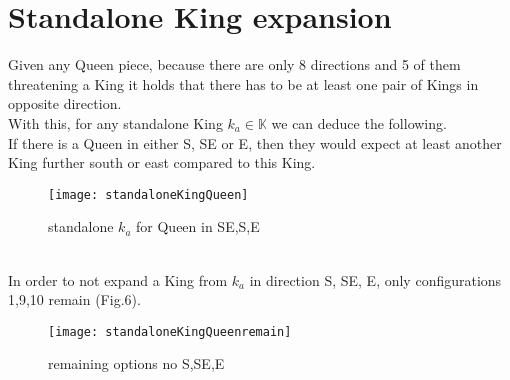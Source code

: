 \documentclass[a4paper,oneside]{scrarticle}
\begin{document}
	\section{Standalone King expansion}
	Given any Queen piece, because there are only 8 directions and 5 of them threatening a King it holds that there has to be at least one pair of Kings in opposite direction.\\
	With this, for any standalone King $k_a\in\mathbb{K}$ we can deduce the following.\\
	If there is a Queen in either S, SE or E, then they would expect at least another King further south or east compared to this King.
	\\
	\begin{figure}[h]
		\centering
		\texttt{[image: standaloneKingQueen]}
		\caption{standalone $k_a$ for Queen in SE,S,E}
		\label{fig:standalonekingqueen}
	\end{figure}
	\\
	In order to not expand a King from $k_a$ in direction S, SE, E, only configurations 1,9,10 remain (Fig.6).
	\\
	\begin{figure}[h]
		\centering
		\texttt{[image: standaloneKingQueenremain]}
		\caption{remaining options no S,SE,E}
		\label{fig:standalonekingqueenremain}
	\end{figure}
	
	
	
\end{document}
